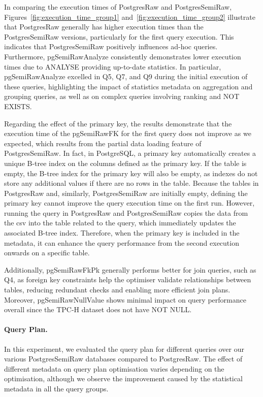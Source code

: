 In comparing the execution times of PostgresRaw and PostgresSemiRaw, Figures~\ref{fig:execution_time_group1} and~\ref{fig:execution_time_group2} illustrate that PostgresRaw generally has higher execution times than the PostgresSemiRaw versions, particularly for the first query execution. This indicates that PostgresSemiRaw positively influences ad-hoc queries. Furthermore, pgSemiRawAnalyze consistently demonstrates lower execution times due to ANALYSE providing up-to-date statistics. In particular, pgSemiRawAnalyze excelled in Q5, Q7, and Q9 during the initial execution of these queries, highlighting the impact of statistics metadata on aggregation and grouping queries, as well as on complex queries involving ranking and NOT EXISTS.

Regarding the effect of the primary key, the results demonstrate that the execution time of the pgSemiRawFK for the first query does not improve as we expected, which results from the partial data loading feature of PostgresSemiRaw. In fact, in PostgreSQL, a primary key automatically creates a unique B-tree index on the columns defined as the primary key. If the table is empty, the B-tree index for the primary key will also be empty, as indexes do not store any additional values if there are no rows in the table. Because the tables in PostgresRaw and, similarly, PostgresSemiRaw are initially empty, defining the primary key cannot improve the query execution time on the first run. However, running the query in PostgresRaw and PostgresSemiRaw copies the data from the \acrshort{csv} into the table related to the query, which immediately updates the associated B-tree index. Therefore, when the primary key is included in the metadata, it can enhance the query performance from the second execution onwards on a specific table.

Additionally, pgSemiRawFkPk generally performs better for join queries, such as Q4, as foreign key constraints help the optimiser validate relationships between tables, reducing redundant checks and enabling more efficient join plans. Moreover, pgSemiRawNullValue shows minimal impact on query performance overall since the TPC-H dataset does not have  NOT NULL.


% 
% 

\paragraph{Query Plan.}
In this experiment, we evaluated the query plan for different queries over our various PostgresSemiRaw databases compared to PostgresRaw. The effect of different metadata on query plan optimisation varies depending on the optimisation, although we observe the improvement caused by the statistical metadata in all the query groups.

